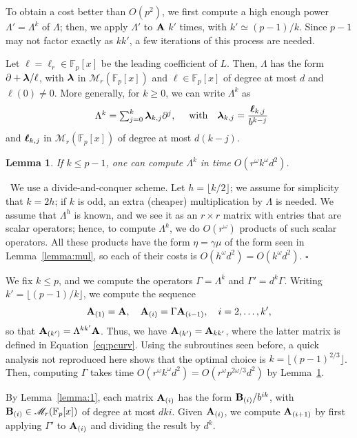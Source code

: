 \documentclass{sig-alternate}
\def\bell{\mbox{\boldmath$\ell$}}
\def\blambda{\mbox{\boldmath$\lambda$}}
\def\F {\mathbb{F}}
\def\mA {\ensuremath{{\bf A}}}
\def\mB {\ensuremath{{\bf B}}}
\def\myproof{\noindent{\sc Proof.}~}
\def\foorp{\hfill$\square$}
\newtheorem{Lemma}{Lemma}
\begin{document}
To obtain a cost better than $O(p^2)$, we first compute a high enough
power $\Lambda'=\Lambda^k$ of $\Lambda$; then, we apply $\Lambda'$ to
$\mA$ $k'$ times, with $k'\simeq (p-1)/k$. Since $p-1$ may not factor
exactly as $kk'$, a few iterations of this process are needed.

\smallskip{} Let $\ell=\ell_r \in
\F_p[x]$ be the leading coefficient of $L$. Then, $\Lambda$ has the
form $\partial+ \blambda/\ell$, with $\blambda$ in
$\mathscr{M}_r(\F_p[x])$ and $\ell \in \F_p[x]$ of degree at most $d$
and $\ell(0)\ne 0$. More generally, for $k \ge 0$, we can write
$\Lambda^k$ as
$$\begin{array}{c}\Lambda^k =\sum_{j=0}^k \blambda_{k,j} \partial^j,
\end{array} \quad 
\text{with}\quad \blambda_{k,j}=\frac{\bell_{k,j}}{b^{k-j}}$$
and $\bell_{k,j}$ in $\mathscr{M}_r(\F_p[x])$ of degree at most $d (k-j)$.  

\begin{Lemma}\label{lemma:powerK}
  If $k \le p-1$, one can compute $\Lambda^k$ in time $O(r^\omega k^\omega d^2)$.
\end{Lemma}
\myproof We use a divide-and-conquer scheme. Let $h=\lfloor k/2
\rfloor$; we assume for simplicity that $k=2h$; if $k$ is odd, an
extra (cheaper) multiplication by $\Lambda$ is needed. We assume that
$\Lambda^{h}$ is known, and we see it as an $r \times r$ matrix with
entries that are scalar operators; hence, to compute $\Lambda^k$, we
do $O(r^\omega)$ products of such scalar operators. All these products
have the form $\eta=\gamma \mu$ of the form seen in
Lemma~\ref{lemma:mul}, so each of their costs is $O(h^\omega d^2)=O(k^\omega d^2)$.
\foorp

\smallskip\noindent{\bf Computing $\Lambda^{kk'}\mA$.}  We fix $k\le p$,
and we compute the operators $\Gamma=\Lambda^k$ and $\Gamma'=d^k
\Gamma$. Writing $k'=\lfloor (p-1)/k \rfloor$,
we compute the sequence
$$\mA_{(1)} = \mA,\quad \mA_{(i)} = \Gamma \mA_{(i-1)},\quad
i=2,\dots,k',$$ so that $\mA_{(k')}=\Lambda^{kk'}\mA$. Thus, we have
$\mA_{(k')}=\mA_{kk'}$, where the latter matrix is defined in
Equation~\eqref{eq:pcurv}. Using the subroutines seen before, a quick
analysis not reproduced here shows that the optimal choice is
$k=\lfloor (p-1)^{2/3} \rfloor$. Then, computing $\Gamma$ takes time
$O(r^\omega k^\omega d^2)=O(r^\omega p^{2\omega/3} d^2)$ by
Lemma~\ref{lemma:powerK}.

By Lemma~\ref{lemma:1}, each matrix $\mA_{(i)}$ has the form
$\mB_{(i)}/b^{ik}$, with $\mB_{(i)}\in \mathscr{M}_r(\F_p[x])$ of
degree at most $dki$. Given $\mA_{(i)}$, we compute $\mA_{(i+1)}$ by
first applying $\Gamma'$ to $\mA_{(i)}$ and dividing the result by
$d^k$. 
\end{document}
